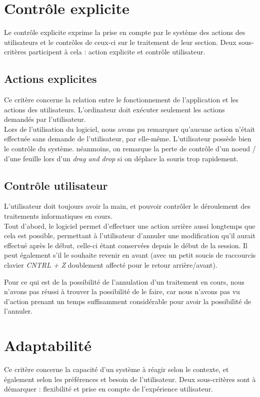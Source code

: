 \documentclass[12pt, a4paper]{article}
\begin{document}
\section{Contrôle explicite}
Le contrôle explicite exprime la prise en compte par le système des actions des utilisateurs et le contrôles de ceux-ci sur le traitement de leur section. Deux sous-critères participent à cela : action explicite et contrôle utilisateur.
\subsection{Actions explicites}
Ce critère concerne la relation entre le fonctionnement de l'application et les actions des utilisateurs. L'ordinateur doit exécuter seulement les actions demandés par l'utilisateur.\\


Lors de l'utilisation du logiciel, nous avons pu remarquer qu'aucune action n'était effectuée sans demande de l'utilisateur, par elle-même. L'utilisateur possède bien le contrôle du système. néanmoins, on remarque la perte de contrôle d'un noeud / d'une feuille lors d'un \emph{drag and drop} si on déplace la souris trop rapidement.

\subsection{Contrôle utilisateur}
L'utilisateur doit toujours avoir la main, et pouvoir contrôler le déroulement des traitements informatiques en cours. \\


Tout d'abord, le logiciel permet d'effectuer une action arrière aussi longtemps que cela est possible, permettant à l'utilisateur d'annuler une modification qu'il aurait effectué après le début, celle-ci étant conservées depuis le début de la session. Il peut également s'il le souhaite revenir en avant (avec un petit soucis de raccourcis clavier \emph{CNTRL + Z} doublement affecté pour le retour arrière/avant).


Pour ce qui est de la possibilité de l'annulation d'un traitement en cours, nous n'avons pas réussi à trouver la possibilité de le faire, car nous n'avons pas vu d'action prenant un temps suffisamment considérable pour avoir la possibilité de l'annuler.

\section{Adaptabilité}
Ce critère concerne la capacité d'un système à réagir selon le contexte, et également selon les préférences et besoin de l'utilisateur. Deux sous-critères sont à démarquer : flexibilité et prise en compte de l'expérience utilisateur. 
\end{document}
